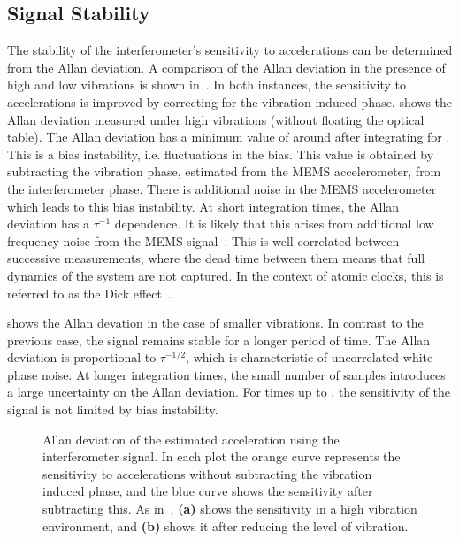 \subsection{Signal Stability}\label{subsec:stability}	
The stability of the interferometer's sensitivity to accelerations can
be determined from the Allan deviation. A comparison of the
Allan deviation in the presence of high and low vibrations is shown
in~. In both instances, the sensitivity
to accelerations is improved by correcting for the vibration-induced
phase.  shows the Allan deviation
measured under high vibrations (without floating the optical table).
The Allan deviation has a minimum value
of around  after integrating for
. This is a bias instability, i.e. fluctuations in
the bias. This value is obtained by subtracting the vibration
phase, estimated from the MEMS accelerometer, from the interferometer
phase. There is additional noise in the MEMS
accelerometer which leads to this bias instability. At short
integration times, the Allan deviation has a $\tau^{-1}$
dependence. It is likely that this arises from additional low
frequency noise from the MEMS signal~\cite{Meunier2015, Fang2016}. This is
well-correlated between successive measurements, where the dead time
between them means that full dynamics of the system are not captured. In the context of
atomic clocks, this is referred to as the Dick effect~\cite{Dick1990}.  
\par\noindent
{} shows the Allan devation in the case of
smaller vibrations. In contrast to the previous case, the signal
remains stable for a longer period of time. The Allan deviation
is proportional to \(\tau^{-1/2}\), which is characteristic of
uncorrelated white phase noise. At longer integration times, the
small number of samples introduces a large uncertainty on the Allan
deviation. For times up to , 
the sensitivity of the signal is not limited by bias
instability. 
\begin{figure}[htpb!]
  \centering
  \caption[Comparison of Allan deviation in a high and
    low vibration
  environment.]{Allan deviation of the estimated acceleration using
    the interferometer signal. In each plot the orange curve
    represents the sensitivity to accelerations without subtracting
    the vibration induced phase, and the blue curve shows the
    sensitivity after subtracting this. 
    As in~, \textbf{(a)} shows
    the sensitivity in a high vibration environment, and
    \textbf{(b)} shows it after reducing the level of vibration.}
  \label{fig:adev_comparison}
\end{figure}

